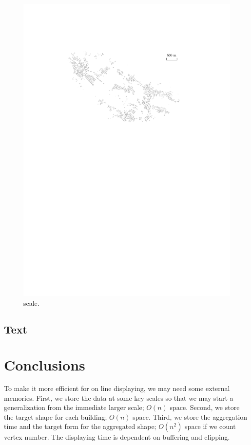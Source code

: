 \documentclass[graybox]{svmult}
\begin{document}
\begin{figure}[tb]
	\centering
	\includegraphics{Data}
	\caption{scale.}
	\label{fig:Data}
\end{figure}


\subsection{Text}
\label{sec:Formalizing}



\section{Conclusions}
\label{sec:Conclusions}


To make it more efficient for on line displaying, we may need 
some external memories. First, we store the data at some key 
scales so that we may start a generalization from the immediate 
larger scale; $O(n)$ space. Second, we store the target shape 
for each building; $O(n)$ space. Third, we store the aggregation 
time and the target form for the aggregated shape; $O(n^2)$ 
space if we count vertex number.
%
The displaying time is dependent on buffering and clipping.
\end{document}
